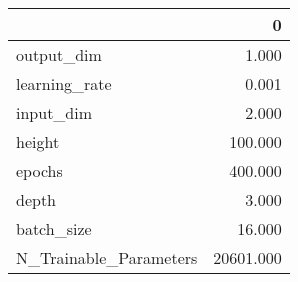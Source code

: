 \begin{tabular}{lr}
\toprule
{} &          0 \\
\midrule
output\_dim             &      1.000 \\
learning\_rate          &      0.001 \\
input\_dim              &      2.000 \\
height                 &    100.000 \\
epochs                 &    400.000 \\
depth                  &      3.000 \\
batch\_size             &     16.000 \\
N\_Trainable\_Parameters &  20601.000 \\
\bottomrule
\end{tabular}
